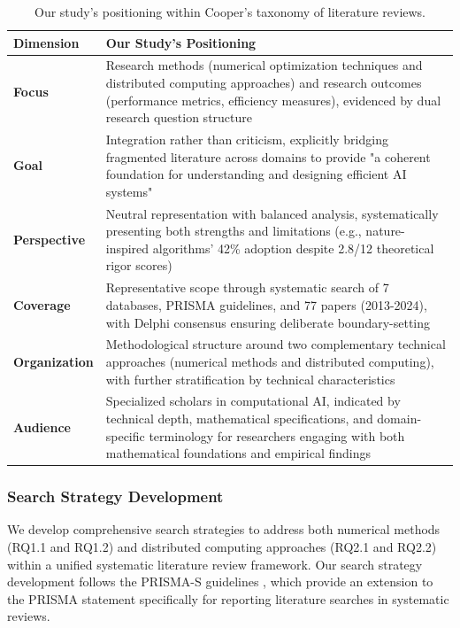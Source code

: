 \documentclass[acmsmall]{acmart}
\begin{document}
\begin{table}[!htb]
    \centering
    \begingroup
    \setlength{\tabcolsep}{8pt}
    \renewcommand{\arraystretch}{1.4}
    \begin{tabular}{>{\bfseries}p{2.5cm} p{11cm}}
        \toprule
        \textbf{Dimension} & \textbf{Our Study's Positioning} \\
        \midrule
        Focus & Research methods (numerical optimization techniques and distributed computing approaches) and research outcomes (performance metrics, efficiency measures), evidenced by dual research question structure \\
        \addlinespace
        Goal & Integration rather than criticism, explicitly bridging fragmented literature across domains to provide "a coherent foundation for understanding and designing efficient AI systems" \\
        \addlinespace
        Perspective & Neutral representation with balanced analysis, systematically presenting both strengths and limitations (e.g., nature-inspired algorithms' 42\% adoption despite 2.8/12 theoretical rigor scores) \\
        \addlinespace
        Coverage & Representative scope through systematic search of 7 databases, PRISMA guidelines, and 77 papers (2013-2024), with Delphi consensus ensuring deliberate boundary-setting \\
        \addlinespace
        Organization & Methodological structure around two complementary technical approaches (numerical methods and distributed computing), with further stratification by technical characteristics \\
        \addlinespace
        Audience & Specialized scholars in computational AI, indicated by technical depth, mathematical specifications, and domain-specific terminology for researchers engaging with both mathematical foundations and empirical findings \\
        \bottomrule
    \end{tabular}
    \endgroup
    \caption{Our study's positioning within Cooper's taxonomy of literature reviews.}
    \label{tab:cooper_taxonomy}
\end{table}



\subsubsection{Search Strategy Development}\label{subsubsec:phase-1-planning-and-protocol-development:search-strategy-development}
We develop comprehensive search strategies to address both numerical methods (RQ1.1 and RQ1.2) and distributed computing approaches (RQ2.1 and RQ2.2) within a unified systematic literature review framework. Our search strategy development follows the PRISMA-S guidelines \citep{rethlefsen2021prisma}, which provide an extension to the PRISMA statement specifically for reporting literature searches in systematic reviews.
\end{document}

